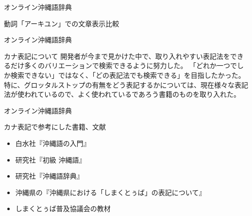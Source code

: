 \documentclass[14pt]{beamer}
\begin{document}
\begin{frame}{オンライン沖縄語辞典}
\begin{block}{動詞「アーキユン」での文章表示比較}
\begin{figure}[ht]
\begin{minipage}{0.5\textwidth}
      \end{minipage}
    \end{figure}
  \end{block}
\end{frame}


\begin{frame}{オンライン沖縄語辞典}
  \begin{block}{カナ表記について}
    \vspace{0pt}
    開発者が今まで見かけた中で、取り入れやすい表記法をできるだけ多くのバリエーションで検索できるように努力した。
    「どれか一つでしか検索できない」ではなく、「どの表記法でも検索できる」を目指したかった。
    特に、グロッタルストップの有無をどう表記するかについては、現在様々な表記法が使われているので、よく使われているであろう書籍のものを取り入れた。
  \end{block}
\end{frame}

\begin{frame}{オンライン沖縄語辞典}
  \begin{block}{カナ表記で参考にした書籍、文献}
    \vspace{0pt}
    \begin{itemize}
    \item 白水社『沖縄語の入門』
    \item 研究社『初級 沖縄語』
    \item 研究社『沖縄語辞典』
    \item 沖縄県の『沖縄県における「しまくとぅば」の表記について』
    \item しまくとぅば普及協議会の教材
    \end{itemize}
  \end{block}
\end{frame}
\end{document}
